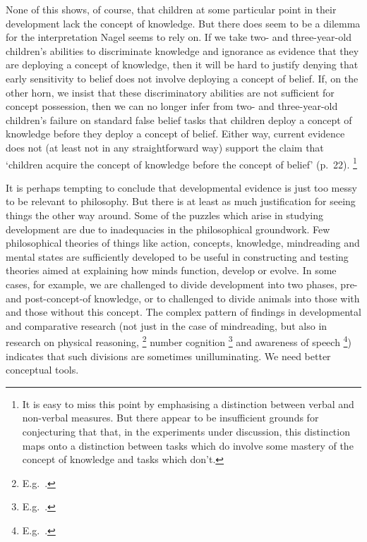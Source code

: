 \documentclass[11pt,a4paper]{extarticle}
\begin{document}
None of this shows, of course, that children at some particular point in their development lack the concept of knowledge.
But there does seem to be a dilemma for the interpretation  Nagel seems to rely on.
If we take two- and three-year-old children's abilities to discriminate knowledge and ignorance as evidence that they are deploying a concept of knowledge,
then it will be hard to justify denying that early sensitivity to belief does not involve deploying a concept of belief.
If, on the other horn, we insist that these discriminatory abilities are not sufficient for concept possession,
then we can no longer infer from two- and three-year-old children's failure on standard false belief tasks that  children deploy a concept of knowledge before they deploy a concept of belief.
Either way, current evidence does not 
(at least not in any straightforward way)
support the claim that `children acquire the concept of knowledge before the concept of belief' (p.\ 22).%
\footnote{
It is easy to miss this point by emphasising a distinction between verbal and non-verbal measures.
But there appear to be insufficient grounds for conjecturing that that, in the experiments under discussion, 
this distinction maps onto a distinction between 
tasks which do involve some mastery of the concept of knowledge
and
tasks which don't.
}

It is perhaps tempting to conclude that developmental evidence is just too messy to be relevant to philosophy.
But there is at least as much justification for seeing things the other way around.
Some of the puzzles which arise in studying development are due to inadequacies in the philosophical groundwork.
Few philosophical theories of things like action, concepts, knowledge, mindreading and mental states are sufficiently developed to be useful in constructing and testing theories aimed at explaining 
 how minds function, develop or evolve.
In some cases, for example, we are challenged to divide development into two phases, pre- and post-concept-of knowledge, or to challenged to divide animals into those with and those without this concept.
The complex pattern of findings in developmental and comparative research (not just in the case of mindreading, but also in research on physical reasoning,%
\footnote{
E.g.\ \citet{Berthier:2000eu,Baillargeon:2002hb,Hood:2003yg}.
}
number cognition%
\footnote{
E.g.\ \citet{Xu:2003qw,feigenson_limits_2005,gallistel_non-verbal_2000,gelman_number_2005}.
}
and awareness of speech%
\footnote{
E.g.\ \citet{Eimas:1971cp,Jusczyk:1995it,Anthony:2004yp,Liberman:1990mo}.
}) 
indicates that such divisions are sometimes unilluminating.
We need better conceptual tools.
\end{document}
